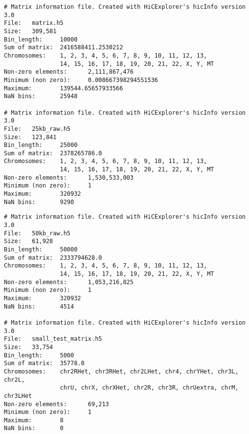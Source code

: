 \begin{verbatim}
# Matrix information file. Created with HiCExplorer's hicInfo version 3.0
File:   matrix.h5
Size:   309,581
Bin_length:     10000
Sum of matrix:  2416588411.2530212
Chromosomes:    1, 2, 3, 4, 5, 6, 7, 8, 9, 10, 11, 12, 13,
                14, 15, 16, 17, 18, 19, 20, 21, 22, X, Y, MT
Non-zero elements:      2,111,867,476
Minimum (non zero):     0.008667398294551536
Maximum:        139544.65657933566
NaN bins:       25948

# Matrix information file. Created with HiCExplorer's hicInfo version 3.0
File:   25kb_raw.h5
Size:   123,841
Bin_length:     25000
Sum of matrix:  2378265786.0
Chromosomes:    1, 2, 3, 4, 5, 6, 7, 8, 9, 10, 11, 12, 13,
                14, 15, 16, 17, 18, 19, 20, 21, 22, X, Y, MT
Non-zero elements:      1,530,533,003
Minimum (non zero):     1
Maximum:        320932
NaN bins:       9290
\end{verbatim}
\newpage
\begin{verbatim}
# Matrix information file. Created with HiCExplorer's hicInfo version 3.0
File:   50kb_raw.h5
Size:   61,928
Bin_length:     50000
Sum of matrix:  2333794628.0
Chromosomes:    1, 2, 3, 4, 5, 6, 7, 8, 9, 10, 11, 12, 13,
                14, 15, 16, 17, 18, 19, 20, 21, 22, X, Y, MT
Non-zero elements:      1,053,216,825
Minimum (non zero):     1
Maximum:        320932
NaN bins:       4514

# Matrix information file. Created with HiCExplorer's hicInfo version 3.0
File:   small_test_matrix.h5
Size:   33,754
Bin_length:     5000
Sum of matrix:  35778.0
Chromosomes:    chr2RHet, chr3RHet, chr2LHet, chr4, chrYHet, chr3L, chr2L,
                chrU, chrX, chrXHet, chr2R, chr3R, chrUextra, chrM, chr3LHet
Non-zero elements:      69,213
Minimum (non zero):     1
Maximum:        8
NaN bins:       0
\end{verbatim}




%
%
%
%





